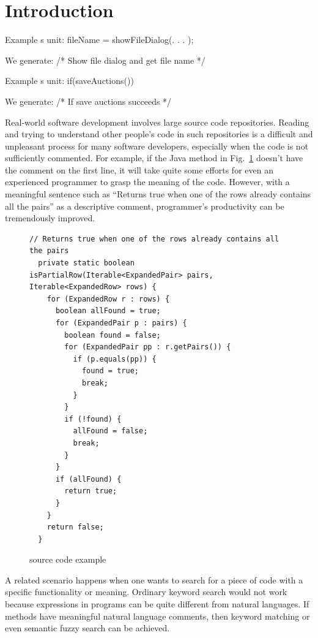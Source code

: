 \section{Introduction}

Example s unit: fileName = showFileDialog(. . . );

We generate: /* Show file dialog and get file name */

Example s unit: if(saveAuctions())

We generate: /* If save auctions succeeds */


Real-world software development involves large source code repositories. 
Reading and trying to understand other people's code in such repositories 
is a difficult and unpleasant process for many software developers, 
especially when the code is not sufficiently commented.
For example, if the Java method in Fig.~\ref{figure:sourceCodeExample} doesn't 
have the comment on the first line, it will take quite some efforts for
even an experienced programmer to grasp the meaning of the code.
However, with a meaningful sentence such as 
``Returns true when one of the rows already contains all the pairs'' as
a descriptive comment, programmer's  productivity can be
tremendously improved.

\begin{figure}[th]
\begin{lstlisting}
// Returns true when one of the rows already contains all the pairs
  private static boolean isPartialRow(Iterable<ExpandedPair> pairs, Iterable<ExpandedRow> rows) {
    for (ExpandedRow r : rows) {
      boolean allFound = true;
      for (ExpandedPair p : pairs) {
        boolean found = false;
        for (ExpandedPair pp : r.getPairs()) {
          if (p.equals(pp)) {
            found = true;
            break;
          }
        }
        if (!found) {
          allFound = false;
          break;
        }
      }
      if (allFound) {
        return true;
      }
    }
    return false;
  }
\end{lstlisting}
\caption{\label{figure:sourceCodeExample}source code example}
\end{figure}


A related scenario happens when one wants to search for a piece of code with
a specific functionality or meaning. Ordinary keyword search would not work
because expressions in programs can be quite different from natural languages.
If methods have meaningful natural language comments, then
keyword matching or even semantic fuzzy search can be achieved.

